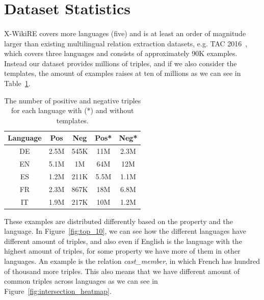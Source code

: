 \section{Dataset Statistics}
\label{sec:data_stats}
\paragraph{}
X-WikiRE covers  more  languages  (five)  and  is  at  least  an  order of magnitude larger than existing multilingual relation extraction datasets,  e.g.  TAC 2016~\citep{ellis2015overview}, which  covers  three  languages  and  consists  of approximately 90K examples. Instead our dataset provides millions of triples, and if we also consider the templates, the amount of examples raises at ten of millions as we can see in Table~\ref{table:datasetstats}.

\begin{table}[h!]
\fontsize{12}{12}\selectfont
\centering
\begin{tabular}{c | c c c c}
\toprule
Language & Pos  & Neg  & Pos*  & Neg* \\ \midrule
DE       & 2.5M & 545K & 11M  & 2.3M \\ %
EN       & 5.1M & 1M   & 64M  & 12M  \\ %
ES       & 1.2M & 211K & 5.5M & 1.1M \\ %
FR       & 2.3M & 867K & 18M  & 6.8M \\ %
IT       & 1.9M & 217K & 10M  & 1.2M \\ %
\bottomrule
\end{tabular}
\caption{The number of positive and negative triples for each language with (*) and without templates.}
\label{table:datasetstats}
\end{table}

These examples are distributed differently based on the property and the language. In Figure~\ref{fig:top_10}, we can see how the different languages have different amount of triples, and also even if English is the language with the highest amount of triples, for some property we have more of them in other languages. An example is the relation \textit{cast\_member}, in which French has hundred of thousand more triples. This also means that we have different amount of common triples across languages as we can see in Figure~\ref{fig:intersection_heatmap}. 



